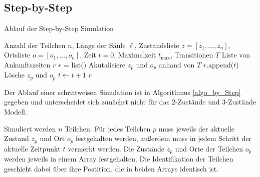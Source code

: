 
\subsection{Step-by-Step}


\begin{algorithm}
\caption{Ablauf der Step-by-Step Simulation}
\label{algo_by_Step}
\begin{algorithmic}[1]
\REQUIRE Anzahl der Teilchen $n$, Länge der Säule $\ell$, Zustandsliste $z= [z_1 , \ldots, z_n]$, Ortsliste $o=[o_1, \ldots , o_n]$, Zeit $t=0$, Maximalzeit $t_{\text{max}}$, Transitionen $T$
\ENSURE Liste von Ankunftszeiten $r$
\STATE $r$ = list()
\STATE Akutalisiere $z_p$ und $o_p$ anhand von $T$
\STATE $r$.append($t$)
\STATE Lösche $z_p$ und $o_p$
\ENDIF
\ENDFOR
\STATE $t \leftarrow t+1$%
\ENDWHILE
\RETURN $r$
\end{algorithmic}
\end{algorithm}


Der Ablauf einer schrittweisen Simulation ist in Algorithmus \ref{algo_by_Step} gegeben und unterscheidet sich zunächst nicht für das 2-Zustände und 3-Zustände Modell.

Simuliert werden $n$ Teilchen. Für jedes Teilchen $p$ muss jeweils der aktuelle Zustand $z_p$ und Ort $o_p$ festgehalten werden, außerdem muss in jedem Schritt der aktuelle Zeitpunkt $t$ vermerkt werden. Die Zustände $z_p$ und Orte der Teilchen $o_p$ %
werden jeweils in einem Array festgehalten. Die Identifikation der Teilchen geschieht dabei über ihre Postition, die in beiden Arrays identisch ist.

